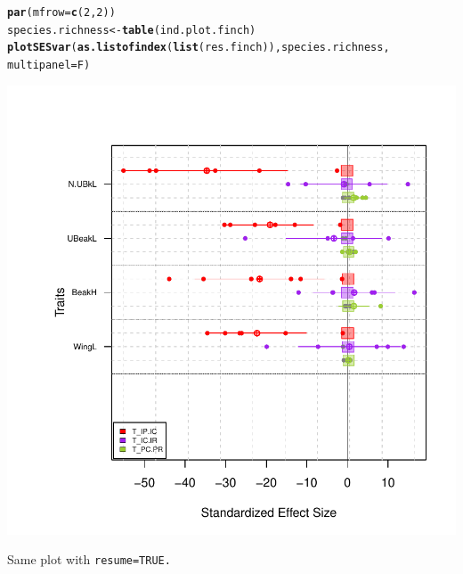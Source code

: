 \documentclass[12pt]{article}\usepackage[]{graphicx}\usepackage[]{color}
\makeatletter
\def\maxwidth{ %
  \ifdim\Gin@nat@width>\linewidth
    \linewidth
  \else
    \Gin@nat@width
  \fi
}
\newcommand{\hlnum}[1]{\textcolor[rgb]{0.686,0.059,0.569}{#1}}%
\newcommand{\hlstd}[1]{\textcolor[rgb]{0.345,0.345,0.345}{#1}}%
\newcommand{\hlkwb}[1]{\textcolor[rgb]{0.69,0.353,0.396}{#1}}%
\newcommand{\hlkwc}[1]{\textcolor[rgb]{0.333,0.667,0.333}{#1}}%
\newcommand{\hlkwd}[1]{\textcolor[rgb]{0.737,0.353,0.396}{\textbf{#1}}}%
\newenvironment{kframe}{%
 \def\at@end@of@kframe{}%
 \ifinner\ifhmode%
  \def\at@end@of@kframe{\end{minipage}}%
  \begin{minipage}{\columnwidth}%
 \fi\fi%
 \def\FrameCommand##1{\hskip\@totalleftmargin \hskip-\fboxsep
 \colorbox{shadecolor}{##1}\hskip-\fboxsep
     \hskip-\linewidth \hskip-\@totalleftmargin \hskip\columnwidth}%
 \MakeFramed {\advance\hsize-\width
   \@totalleftmargin\z@ \linewidth\hsize
   \@setminipage}}%
 {\par\unskip\endMakeFramed%
 \at@end@of@kframe}
\newenvironment{knitrout}{}{} %
\makeatother
\begin{document}
\begin{knitrout}
\color{fgcolor}\begin{kframe}
\begin{alltt}
\hlkwd{par}\hlstd{(}\hlkwc{mfrow}\hlstd{=}\hlkwd{c}\hlstd{(}\hlnum{2}\hlstd{,}\hlnum{2}\hlstd{))}
\hlstd{species.richness}\hlkwb{<-}\hlkwd{table}\hlstd{(ind.plot.finch)}
\hlkwd{plotSESvar}\hlstd{(}\hlkwd{as.listofindex}\hlstd{(}\hlkwd{list}\hlstd{(res.finch)), species.richness,}
             \hlkwc{multipanel}\hlstd{=F)}
\end{alltt}
\end{kframe}
\includegraphics[width=\maxwidth]{figure/unnamed-chunk-34} 

\end{knitrout}

Same plot with \tt{resume=TRUE}.
\end{document}
